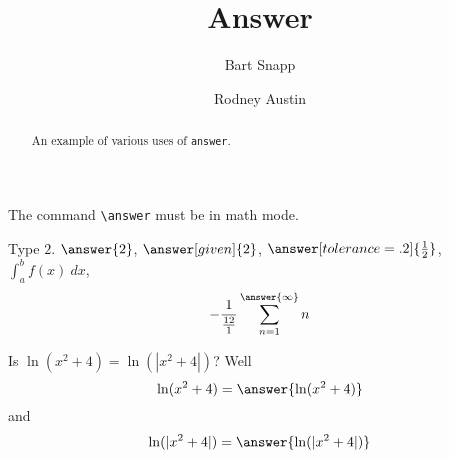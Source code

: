 


\title{Answer}
\author{Bart Snapp \and Rodney Austin}


\begin{abstract}
  An example of various uses of \texttt{answer}.
\end{abstract}
\maketitle


The command \verb|\answer| must be in math mode. 


\begin{problem}
  Type $2$. $\answer{2}$, $\answer[given]{2}$, $\answer[tolerance=.2]{\frac{1}{2}}$,  $\int_a^b f(x) \ dx$,
  \[
  -\frac{1}{\frac{12}{1}}\sum_{n=1}^{\answer{\infty}} n
  \]
\end{problem}


\begin{problem}
  Is $\ln(x^2+4) = \ln(|x^2+4|)$? Well
  \[
  \ln(x^2+4) = \answer{ \ln(x^2+4) }
  \]
  and
  \[
  \ln(|x^2+4|) = \answer{ \ln(|x^2+4|) }
  \]
\end{problem}




